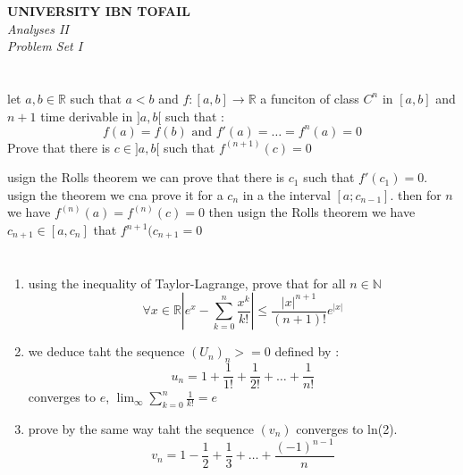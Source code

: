 \documentclass[12pt]{article}
\begin{document}
\begin{center}
	\Large\textbf{UNIVERSITY IBN TOFAIL} \\[1em]
	\large\textit{Analyses II} \\[2em]
	\large\textit{Problem Set I} \\[0.5em]
\end{center}

\vspace{1cm}

\section{}
let $a,b \in \mathbb{R}$ such that $a < b$ and $f: [a,b] \to \mathbb{R}$ a funciton of class $C^n$ in $[a,b]$ and $n+1$ time derivable in $]a,b[$ such that :
$$
	f(a) = f(b) \text{ and } f'(a) = \dots = f^n(a) = 0
$$
Prove that there is $c \in ]a,b[$ such that $f^{(n+1)}(c) = 0$


\begin{correctionbox}
	usign the Rolls theorem we can prove that there is $c_1$ such that $f'(c_1)=0$.
	usign the theorem we cna prove it for a $c_n$ in a the interval $[a;c_{n-1}]$.
	then for $n$ we have $f^{(n)}(a) = f^{(n)}(c) = 0$ then usign the Rolls theorem
	we have $c_{n+1} \in [a,c_n]$ that $f^{n+1}(c_{n+1}=0$
\end{correctionbox}

\section{}
\begin{enumerate}
	\item using the inequality of Taylor-Lagrange, prove that for all $n \in \mathbb{N}$
	      $$\forall x \in \mathbb{R} \left|e^x - \sum_{k =0}^{n} \frac{x^k}{k!} \right| \le \frac{|x|^{n+1}}{(n+1)!} e^{|x|}$$
	\item we deduce taht the sequence $(U_n)_n>= 0$ defined by :
	      $$u_n = 1 + \frac{1}{1!}+ \frac{1}{2!}+\dots+ \frac{1}{n!}$$
	      converges to $e$, $\lim_{\infty} \sum_{k=0}^{n} \frac{1}{k!}=e$
	\item prove by the same way taht the sequence $(v_n)$ converges to ln(2).
	      $$v_n = 1 - \frac{1}{2}+ \frac{1}{3}+\dots+ \frac{(-1)^{n-1}}{n}$$
\end{enumerate}
\end{document}
